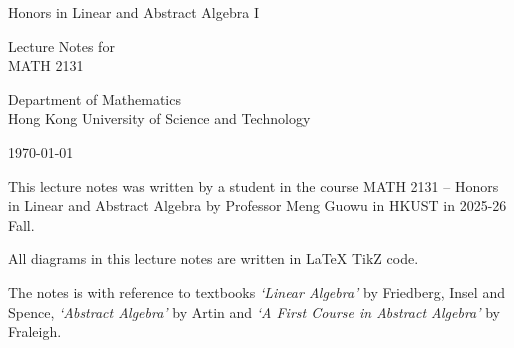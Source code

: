 \documentclass[
	11pt, %
	fleqn, %
	a4paper, %
]{LegrandOrangeBook}
\begin{document}

\titlepage %
	{ %
		\centering\sffamily %
		\vspace{3cm}
		{\huge\color{ocre} Honors in Linear and Abstract Algebra I\par} %
		\vspace{2cm} %
		{Lecture Notes for\\MATH 2131\par} %
        \vspace{2cm}
        {Department of Mathematics\\Hong Kong University of Science and Technology\par}
        \vspace{5cm}
        {\today \par}
		\vfill
	}


\thispagestyle{fancy} %



\vspace{8pt}

\noindent This lecture notes was written by a student in the course MATH 2131 -- Honors in Linear and Abstract Algebra by Professor Meng Guowu in HKUST in 2025-26 Fall. 

\noindent All diagrams in this lecture notes are written in LaTeX TikZ code.

\noindent The notes is with reference to textbooks \textit{`Linear Algebra'} by Friedberg, Insel and Spence, \textit{`Abstract Algebra'} by Artin and \textit{`A First Course in Abstract Algebra'} by Fraleigh. 
\end{document}
